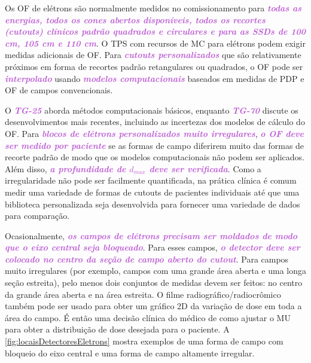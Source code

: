 \documentclass[11pt,a4paper]{article}
\newcounter{exemplo}
\begin{document}
	Os OF de elétrons são normalmente medidos no comissionamento para \textcolor{MediumOrchid}{\textbf{\textit{todas as energias, todos os cones abertos disponíveis, todos os recortes (cutouts) clínicos padrão quadrados e circulares e para as SSDs de 100 cm, 105 cm e 110 cm}}}. O TPS com recursos de MC para elétrons podem exigir medidas adicionais de OF. Para \textcolor{MediumOrchid}{\textbf{\textit{cutouts personalizados}}} que são relativamente próximos em forma de recortes padrão retangulares ou quadrados, o OF pode ser \textcolor{MediumOrchid}{\textbf{\textit{interpolado}}} usando \textcolor{MediumOrchid}{\textbf{\textit{modelos computacionais}}} baseados em medidas de PDP e OF de campos convencionais. 

	O \textcolor{MediumOrchid}{\textbf{\textit{TG-25}}} aborda métodos computacionais básicos, enquanto \textcolor{MediumOrchid}{\textbf{\textit{TG-70}}} discute os desenvolvimentos mais recentes, incluindo as incertezas dos modelos de cálculo do OF. Para \textcolor{MediumOrchid}{\textbf{\textit{blocos de elétrons personalizados muito irregulares}}}, \textcolor{MediumOrchid}{\textbf{\textit{o OF deve ser medido por paciente}}} se as formas de campo diferirem muito das formas de recorte padrão de modo que os modelos computacionais não podem ser aplicados. Além disso, \textcolor{MediumOrchid}{\textbf{\textit{a profundidade de $d_{max}$ deve ser verificada}}}. Como a irregularidade não pode ser facilmente quantificada, na prática clínica é comum medir uma variedade de formas de cutouts de pacientes individuais até que uma biblioteca personalizada seja desenvolvida para fornecer uma variedade de dados para comparação.

	Ocasionalmente, \textcolor{MediumOrchid}{\textbf{\textit{os campos de elétrons precisam ser moldados de modo que o eixo central seja bloqueado}}}. Para esses campos, \textcolor{MediumOrchid}{\textbf{\textit{o detector deve ser colocado no centro da seção de campo aberto do cutout}}}. Para campos muito irregulares (por exemplo, campos com uma grande área aberta e uma longa seção estreita), pelo menos dois conjuntos de medidas devem ser feitos: no centro da grande área aberta e na área estreita. O filme radiográfico/radiocrômico também pode ser usado para obter um gráfico 2D da variação de dose em toda a área do campo. É então uma decisão clínica do médico de como ajustar o MU para obter a distribuição de dose desejada para o paciente. A \ref{fig:locaisDetectoresEletrons} mostra exemplos de uma forma de campo com bloqueio do eixo central e uma forma de campo altamente irregular.
\end{document}
